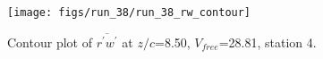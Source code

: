 \begin{figure}[H]
\centering
\texttt{[image: figs/run\_38/run\_38\_rw\_contour]}
\caption{Contour plot of $\overline{r^\prime w^\prime}$ at $z/c$=8.50, $V_{free}$=28.81, station 4.}
\label{fig:run_38_rw_contour}
\end{figure}


